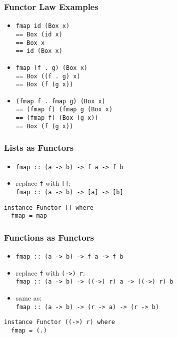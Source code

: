 \documentclass[dvipsnames]{beamer}
\theoremstyle{plain}
\begin{document}
\begin{frame}
  \frametitle{Functor Law Examples}

  \begin{itemize}
    \item \lstinline|fmap id (Box x)|\pause\\
      \lstinline|== Box (id x)|\pause\\
      \lstinline|== Box x|\pause\\
      \lstinline|== id (Box x)|

    \pause
    \bigskip
    \item \lstinline|fmap (f . g) (Box x)|\pause\\
      \lstinline|== Box ((f . g) x)|\pause\\
      \lstinline|== Box (f (g x))|
    \pause
    \item \lstinline|(fmap f . fmap g) (Box x)|\pause\\
      \lstinline|== (fmap f) (fmap g (Box x)|\pause\\
      \lstinline|== (fmap f) (Box (g x))|\pause\\
      \lstinline|== Box (f (g x))|
  \end{itemize}
\end{frame}

\begin{frame}[fragile]
  \frametitle{Lists as Functors}

  \begin{itemize}
    \item \lstinline|fmap :: (a -> b) -> f a -> f b|
    \item replace \lstinline|f| with \lstinline|[]|:\\
      \lstinline|fmap :: (a -> b) -> [a] -> [b]|
  \end{itemize}

  \pause
  \begin{lstlisting}
instance Functor [] where
  fmap = map
  \end{lstlisting}
\end{frame}

\begin{frame}[fragile]
  \frametitle{Functions as Functors}

  \begin{itemize}
    \item \lstinline|fmap :: (a -> b) -> f a -> f b|
    \item replace \lstinline|f| with \lstinline|(->) r|:\\
      \lstinline|fmap :: (a -> b) -> ((->) r) a -> ((->) r) b|
    \item same as:\\
      \lstinline|fmap :: (a -> b) -> (r -> a) -> (r -> b)|
  \end{itemize}

  \pause
  \begin{lstlisting}
instance Functor ((->) r) where
  fmap = (.)
  \end{lstlisting}
\end{frame}
\end{document}
